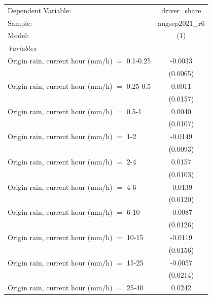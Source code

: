 \ifdefined\ifclassloaded
{}
\fi

\begingroup
\centering
\begin{tabular}{lc}
   \tabularnewline \midrule \midrule
   Dependent Variable:                           & driver\_share\\   
   Sample:                                       & augsep2021\_r6 \\    
   Model:                                        & (1)\\  
   \midrule
   \emph{Variables}\\
   Origin rain, current hour (mm/h) $=$ 0.1-0.25 & -0.0033\\   
                                                 & (0.0065)\\   
   Origin rain, current hour (mm/h) $=$ 0.25-0.5 & 0.0011\\   
                                                 & (0.0157)\\   
   Origin rain, current hour (mm/h) $=$ 0.5-1    & 0.0040\\   
                                                 & (0.0107)\\   
   Origin rain, current hour (mm/h) $=$ 1-2      & -0.0149\\   
                                                 & (0.0093)\\   
   Origin rain, current hour (mm/h) $=$ 2-4      & 0.0157\\   
                                                 & (0.0103)\\   
   Origin rain, current hour (mm/h) $=$ 4-6      & -0.0139\\   
                                                 & (0.0120)\\   
   Origin rain, current hour (mm/h) $=$ 6-10     & -0.0087\\   
                                                 & (0.0126)\\   
   Origin rain, current hour (mm/h) $=$ 10-15    & -0.0119\\   
                                                 & (0.0156)\\   
   Origin rain, current hour (mm/h) $=$ 15-25    & -0.0057\\   
                                                 & (0.0214)\\   
   Origin rain, current hour (mm/h) $=$ 25-40    & 0.0242\\   

\end{tabular}
